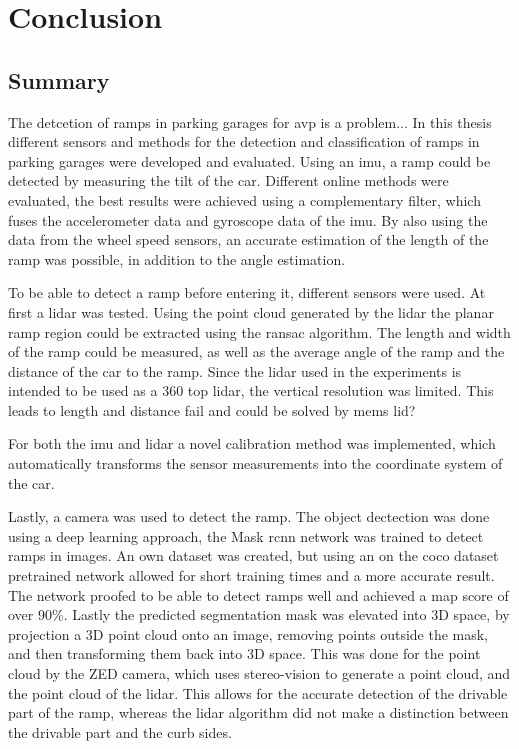 \chapter{Conclusion}
\label{ch:Conclusion}

\section{Summary}
The detcetion of ramps in parking garages for \gls{avp} is a problem...
In this thesis different sensors and methods for the detection and classification of ramps in parking garages were developed and evaluated.
Using an \gls{imu}, a ramp could be detected by measuring the tilt of the car.
Different online methods were evaluated, the best results were achieved using a complementary filter, which fuses the accelerometer data and gyroscope data of the \gls{imu}.
By also using the data from the wheel speed sensors, an accurate estimation of the length of the ramp was possible, in addition to the angle estimation.

To be able to detect a ramp before entering it, different sensors were used.
At first a \gls{lidar} was tested.
Using the point cloud generated by the \gls{lidar} the planar ramp region could be extracted using the \gls{ransac} algorithm.
The length and width of the ramp could be measured, as well as the average angle of the ramp and the distance of the car to the ramp.
Since the \gls{lidar} used in the experiments is intended to be used as a 360 top \gls{lidar}, the vertical resolution was limited.
This leads to length and distance fail and could be solved by mems lid?

For both the \gls{imu} and \gls{lidar} a novel calibration method was implemented, which automatically transforms the sensor measurements into the coordinate system of the car.

Lastly, a camera was used to detect the ramp.
The object dectection was done using a deep learning approach, the Mask \gls{rcnn} network was trained to detect ramps in images.
An own dataset was created, but using an on the \gls{coco} dataset pretrained network allowed for short training times and a more accurate result.
The network proofed to be able to detect ramps well and achieved a \gls{map} score of over 90\%.
Lastly the predicted segmentation mask was elevated into 3D space, by projection a 3D point cloud onto an image, removing points outside the mask, and then transforming them back into 3D space.
This was done for the point cloud by the ZED camera, which uses stereo-vision to generate a point cloud, and the point cloud of the \gls{lidar}.
This allows for the accurate detection of the drivable part of the ramp, whereas the \gls{lidar} algorithm did not make a distinction between the drivable part and the curb sides.



